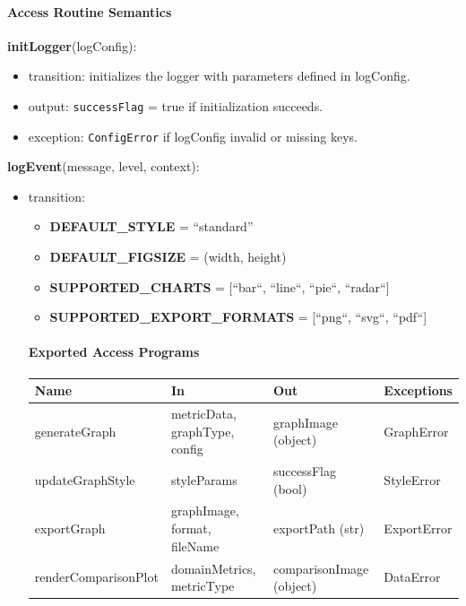 \documentclass[12pt, titlepage]{article}
\begin{document}
\paragraph{Access Routine Semantics}

\noindent \textbf{initLogger}(logConfig):
\begin{itemize}
  \item transition: initializes the logger with parameters defined in logConfig.
  \item output: \texttt{successFlag} = true if initialization succeeds.
  \item exception: \texttt{ConfigError} if logConfig invalid or missing keys.
\end{itemize}

\noindent \textbf{logEvent}(message, level, context):
\begin{itemize}
  \item transition:
  \begin{itemize}
    \item \textbf{DEFAULT\_STYLE} = ``standard''
    \item \textbf{DEFAULT\_FIGSIZE} = (width, height)
    \item \textbf{SUPPORTED\_CHARTS} = [``bar``, ``line``, ``pie``, ``radar``]
    \item \textbf{SUPPORTED\_EXPORT\_FORMATS} = [``png``, ``svg``, ``pdf``]
  \end{itemize}

  \paragraph{Exported Access Programs}
  \begin{center}
  \renewcommand{\arraystretch}{1.2}
  \begin{tabularx}{\textwidth}{l X X l}
  \toprule
  \textbf{Name} & \textbf{In} & \textbf{Out} & \textbf{Exceptions}\\
  \midrule
  generateGraph & metricData, graphType, config & graphImage (object) & GraphError \\
  updateGraphStyle & styleParams & successFlag (bool) & StyleError \\
  exportGraph & graphImage, format, fileName & exportPath (str) & ExportError \\
  renderComparisonPlot & domainMetrics, metricType & comparisonImage (object) & DataError \\
  \bottomrule
  \end{tabularx}
  \end{center}


\end{itemize}
\end{document}
